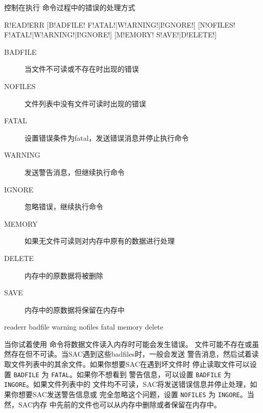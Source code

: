 \label{cmd:readerr}

控制在执行  命令过程中的错误的处理方式

\begin{SACSTX}
R!EAD!ERR [B!ADFILE! F!ATAL!|W!ARNING!|I!GNORE!]
          [N!OFILES! F!ATAL!|W!ARNING!|I!GNORE!]
          [M!EMORY! S!AVE!|D!ELETE!]
\end{SACSTX}

\begin{description}
\item [BADFILE] 当文件不可读或不存在时出现的错误
\item [NOFILES] 文件列表中没有文件可读时出现的错误
\item [FATAL] 设置错误条件为fatal，发送错误消息并停止执行命令
\item [WARNING] 发送警告消息，但继续执行命令
\item [IGNORE] 忽略错误，继续执行命令
\item [MEMORY] 如果无文件可读则对内存中原有的数据进行处理
\item [DELETE] 内存中的原数据将被删除
\item [SAVE] 内存中的原数据将保留在内存中
\end{description}

\begin{SACDFT}
readerr badfile warning nofiles fatal memory delete
\end{SACDFT}

当你试着使用  命令将数据文件读入内存时可能会发生错误。
文件可能不存在或虽然存在但不可读。当SAC遇到这些badfiles时，一般会发送
警告消息，然后试着读取文件列表中的其余文件。如果你想要SAC在遇到坏文件时
停止读取文件可以设置 \texttt{BADFILE} 为 \texttt{FATAL}。如果你不想看到
警告信息，可以设置 \texttt{BADFILE} 为 \texttt{INGORE}。如果文件列表中的
文件均不可读，SAC将发送错误信息并停止处理，如果你想要SAC发送警告信息或
完全忽略这个问题，设置 \texttt{NOFILES} 为 \texttt{INGORE}。当然，SAC内存
中先前的文件也可以从内存中删除或者保留在内存中。
